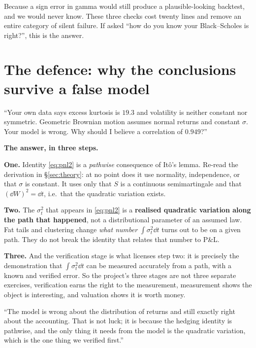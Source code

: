 \documentclass[11pt,a4paper]{article}
\begin{document}
\begin{whybox}
Because a sign error in gamma would still produce a plausible-looking backtest, and we would
never know. These three checks cost twenty lines and remove an entire category of silent
failure. If asked ``how do you know your Black--Scholes is right?'', this is the answer.
\end{whybox}

\section{The defence: why the conclusions survive a false model}
\label{sec:defence}

\begin{qabox}
``Your own data says excess kurtosis is $19.3$ and volatility is neither constant nor symmetric.
Geometric Brownian motion assumes normal returns and constant $\sigma$. Your model is wrong.
Why should I believe a correlation of $0.949$?''
\end{qabox}

\textbf{The answer, in three steps.}

\textbf{One.} Identity \eqref{eq:pnl2} is a \emph{pathwise} consequence of It\^o's lemma.
Re-read the derivation in \S\ref{sec:theory}: at no point does it use normality, independence,
or that $\sigma$ is constant. It uses only that $S$ is a continuous semimartingale and that
$(\dd W)^2=\dd t$, i.e.\ that the quadratic variation exists.

\textbf{Two.} The $\sigma_t^2$ that appears in \eqref{eq:pnl2} is a \textbf{realised quadratic
variation along the path that happened}, not a distributional parameter of an assumed law. Fat
tails and clustering change \emph{what number} $\int\sigma_t^2\dd t$ turns out to be on a given
path. They do not break the identity that relates that number to P\&L.

\textbf{Three.} And the verification stage is what licenses step two: it is precisely the
demonstration that
$\int\sigma_t^2\dd t$ can be measured accurately from a path, with a known and verified error.
So the project's three stages are not three separate exercises, verification earns the
right to the measurement, measurement shows the object is interesting, and valuation shows it
is worth money.

\begin{saybox}
``The model is wrong about the distribution of returns and still exactly right about the
accounting. That is not luck; it is because the hedging identity is pathwise, and the only
thing it needs from the model is the quadratic variation, which is the one thing we verified
first.''
\end{saybox}
\end{document}
